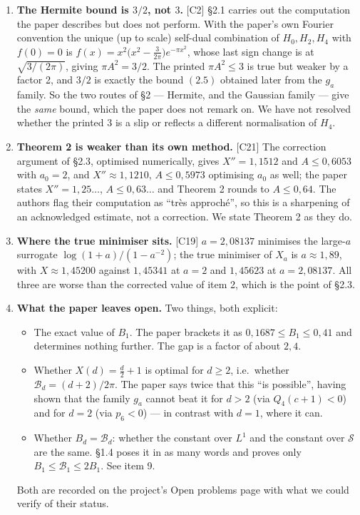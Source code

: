 \documentclass[11pt,reqno]{amsart}
\theoremstyle{plain}
\theoremstyle{definition}
\theoremstyle{remark}
\newcommand{\Ss}{\mathcal{S}}
\newcommand{\Bcal}{\mathcal{B}}
\newcommand{\Ledger}[1]{{\scriptsize\textsf{[#1]}}}
\begin{document}
\begin{enumerate}[leftmargin=1.6em,itemsep=5pt]
\item \textbf{The Hermite bound is $3/2$, not $3$.} \Ledger{C2} \S2.1 carries out the
  computation the paper describes but does not perform. With the paper's own Fourier
  convention the unique (up to scale) self-dual combination of $H_0,H_2,H_4$ with
  $f(0)=0$ is $f(x)=x^2\bigl(x^2-\tfrac3{2\pi}\bigr)e^{-\pi x^2}$, whose last sign
  change is at $\sqrt{3/(2\pi)}$, giving $\pi A^2=3/2$. The printed $\pi A^2\le3$ is
  true but weaker by a factor 2, and $3/2$ is exactly the bound $(2.5)$ obtained later
  from the $g_a$ family. So the two routes of \S2 --- Hermite, and the Gaussian
  family --- give the \emph{same} bound, which the paper does not remark on. We have
  not resolved whether the printed $3$ is a slip or reflects a different
  normalisation of $H_4$.

\item \textbf{Theorem 2 is weaker than its own method.} \Ledger{C21} The correction
  argument of \S2.3, optimised numerically, gives $X''=1{,}1512$ and $A\le0{,}6053$
  with $a_0=2$, and $X''\approx1{,}1210$, $A\le0{,}5973$ optimising $a_0$ as well;
  the paper states $X''=1{,}25\ldots$, $A\le0{,}63\ldots$ and Theorem 2 rounds to
  $A\le0{,}64$. The authors flag their computation as ``tr\`es approch\'e'', so this
  is a sharpening of an acknowledged estimate, not a correction. We state Theorem 2
  as they do.

\item \textbf{Where the true minimiser sits.} \Ledger{C19} $a=2{,}08137$ minimises the
  large-$a$ surrogate $\log(1+a)/(1-a^{-2})$; the true minimiser of $X_a$ is
  $a\approx1{,}89$, with $X\approx1{,}45200$ against $1{,}45341$ at $a=2$ and
  $1{,}45623$ at $a=2{,}08137$. All three are worse than the corrected value of
  item 2, which is the point of \S2.3.

\item \textbf{What the paper leaves open.} Two things, both explicit:
  \begin{itemize}[leftmargin=1.4em]
  \item The exact value of $B_1$. The paper brackets it as
    $0{,}1687\le B_1\le0{,}41$ and determines nothing further. The gap is a factor
    of about $2{,}4$.
  \item Whether $X(d)=\tfrac d2+1$ is optimal for $d\ge2$, i.e.\ whether
    $\Bcal_d=(d+2)/2\pi$. The paper says twice that this ``is possible'', having shown
    that the family $g_a$ cannot beat it for $d>2$ (via $Q_4(c+1)<0$) and for $d=2$
    (via $p_6<0$) --- in contrast with $d=1$, where it can.
  \item Whether $B_d=\Bcal_d$: whether the constant over $L^1$ and the constant over
    $\Ss$ are the same. \S1.4 poses it in as many words and proves only
    $B_1\le\Bcal_1\le2B_1$. See item 9.
  \end{itemize}
  Both are recorded on the project's Open problems page with what we could verify of
  their status.


\end{enumerate}
\end{document}
